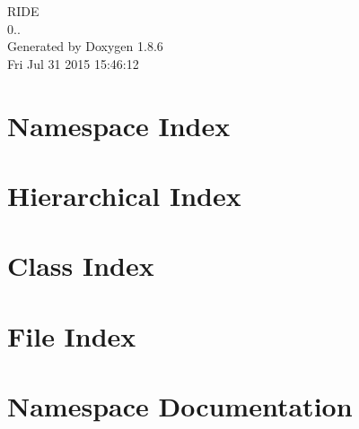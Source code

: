 \documentclass[twoside]{book}
\newcommand{\clearemptydoublepage}{%
  \newpage{\pagestyle{empty}\cleardoublepage}%
}
\begin{document}
\hypersetup{pageanchor=false}
\begin{titlepage}
\vspace*{7cm}
\begin{center}%
{\Large R\-I\-D\-E \\[1ex]\large 0.. }\\
\vspace*{1cm}
{\large Generated by Doxygen 1.8.6}\\
\vspace*{0.5cm}
{\small Fri Jul 31 2015 15:46:12}\\
\end{center}
\end{titlepage}
\clearemptydoublepage
\tableofcontents
\clearemptydoublepage
{}
\hypersetup{pageanchor=true}

\chapter{Namespace Index}

\chapter{Hierarchical Index}

\chapter{Class Index}

\chapter{File Index}

\chapter{Namespace Documentation}







\end{document}
